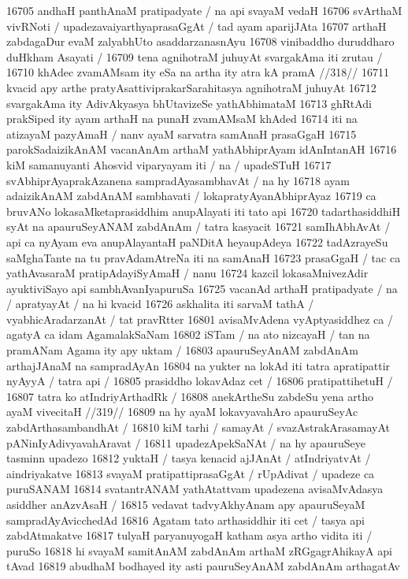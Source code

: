 16705 andhaH panthAnaM pratipadyate / na api svayaM vedaH 
16706 svArthaM vivRNoti / upadezavaiyarthyaprasaGgAt / tad ayam aparijJAta
16707 arthaH zabdagaDur evaM zalyabhUto asaddarzanasnAyu 
16708 vinibaddho duruddharo duHkham Asayati / 
16709 	tena agnihotraM juhuyAt svargakAma iti zrutau /  
16710 	khAdec zvamAMsam ity eSa na artha ity atra kA pramA //318//
16711 kvacid apy arthe pratyAsattiviprakarSarahitasya agnihotraM  juhuyAt
16712 svargakAma ity AdivAkyasya bhUtavizeSe yathAbhimataM 
16713 ghRtAdi prakSiped ity ayam arthaH na punaH zvamAMsaM khAded 
16714 iti na atizayaM pazyAmaH / nanv ayaM sarvatra samAnaH prasaGgaH
16715 parokSadaizikAnAM vacanAnAm arthaM yathAbhiprAyam idAnIntanAH 
16716 kiM samanuyanti Ahosvid viparyayam iti / na / upadeSTuH
16717 svAbhiprAyaprakAzanena sampradAyasambhavAt / na hy 
16718 ayam adaizikAnAM zabdAnAM sambhavati / lokapratyAyanAbhiprAyaz
16719 ca bruvANo lokasaMketaprasiddhim anupAlayati iti tato api 
16720 tadarthasiddhiH syAt na apauruSeyANAM zabdAnAm / tatra kasyacit 
16721 samIhAbhAvAt / api ca nyAyam eva anupAlayantaH paNDitA heyaupAdeya
16722 tadAzrayeSu saMghaTante na tu pravAdamAtreNa iti na samAnaH
16723 prasaGgaH / tac ca yathAvasaraM pratipAdayiSyAmaH / nanu
16724 kazcil lokasaMnivezAdir ayuktiviSayo api sambhAvanIyapuruSa
16725 vacanAd arthaH pratipadyate / na / apratyayAt / na hi kvacid
16726 askhalita iti sarvaM tathA / vyabhicAradarzanAt / tat pravRtter 
16801 avisaMvAdena vyAptyasiddhez ca / agatyA ca idam AgamalakSaNam 
16802 iSTam / na ato nizcayaH / tan na pramANam Agama ity apy uktam /
16803 apauruSeyAnAM zabdAnAm arthajJAnaM na sampradAyAn  
16804 na yukter na lokAd iti tatra apratipattir nyAyyA / tatra api /
16805 	prasiddho lokavAdaz cet /  
16806 pratipattihetuH /  
16807 	tatra ko atIndriyArthadRk / 
16808 	anekArtheSu zabdeSu yena artho ayaM vivecitaH //319//  
16809 na hy ayaM lokavyavahAro apauruSeyAc zabdArthasambandhAt /
16810 kiM tarhi / samayAt / svazAstrakArasamayAt pANinIyAdivyavahAravat /
16811 upadezApekSaNAt / na hy apauruSeye tasminn upadezo
16812 yuktaH / tasya kenacid ajJAnAt / atIndriyatvAt / aindriyakatve  
16813 svayaM pratipattiprasaGgAt / rUpAdivat / upadeze ca puruSANAM 
16814 svatantrANAM yathAtattvam upadezena avisaMvAdasya asiddher anAzvAsaH /
16815 vedavat tadvyAkhyAnam apy apauruSeyaM sampradAyAvicchedAd
16816 Agatam tato arthasiddhir iti cet / tasya api zabdAtmakatve  
16817 tulyaH paryanuyogaH katham asya artho vidita iti / puruSo  
16818 hi svayaM samitAnAM zabdAnAm arthaM zRGgagrAhikayA api tAvad
16819 abudhaM bodhayed ity asti pauruSeyAnAM zabdAnAm arthagatAv 
